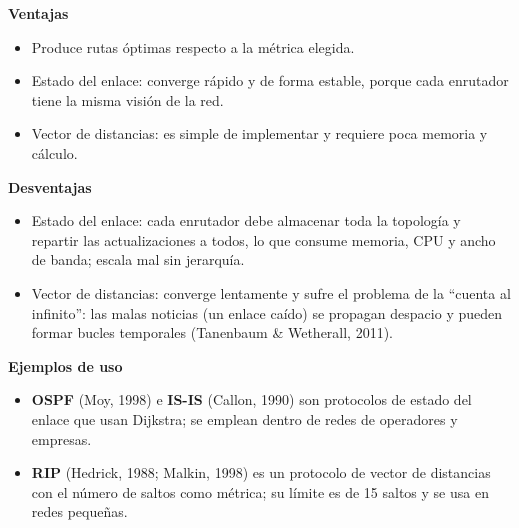 \documentclass[12pt,letterpaper]{article}
\newcommand{\rub}[1]{\par\medskip\noindent\textbf{#1}\par\nopagebreak}
\begin{document}
\rub{Ventajas}
\begin{itemize}[itemsep=2pt]
\item Produce rutas óptimas respecto a la métrica elegida.
\item Estado del enlace: converge rápido y de forma estable, porque cada enrutador tiene la misma visión de la red.
\item Vector de distancias: es simple de implementar y requiere poca memoria y cálculo.
\end{itemize}
\rub{Desventajas}
\begin{itemize}[itemsep=2pt]
\item Estado del enlace: cada enrutador debe almacenar toda la topología y repartir las actualizaciones a todos, lo que consume memoria, CPU y ancho de banda; escala mal sin jerarquía.
\item Vector de distancias: converge lentamente y sufre el problema de la ``cuenta al infinito'': las malas noticias (un enlace caído) se propagan despacio y pueden formar bucles temporales (Tanenbaum \& Wetherall, 2011).
\end{itemize}
\rub{Ejemplos de uso}
\begin{itemize}[itemsep=2pt]
\item \textbf{OSPF} (Moy, 1998) e \textbf{IS-IS} (Callon, 1990) son protocolos de estado del enlace que usan Dijkstra; se emplean dentro de redes de operadores y empresas.
\item \textbf{RIP} (Hedrick, 1988; Malkin, 1998) es un protocolo de vector de distancias con el número de saltos como métrica; su límite es de 15 saltos y se usa en redes pequeñas.
\end{itemize}
\end{document}
